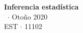 \documentclass[8pt,a4paper]{extarticle}
\renewcommand{\csClass}{Inferencia estadística}
\renewcommand{\csClassCode}{EST $\cdot$ 11102}
\renewcommand{\csTerm}{Otoño 2020}
\begin{document}
\begin{titlepage}
    \begin{center}
        \vspace*{1cm}
        \Huge
        \textbf{\csClass}
        \vspace{0.5cm} \\
        \Large
        \cs\ $\cdot$ \csTerm
        \vfill
        \csAuthorName\\
        \vspace{0.8cm}
        \csClassCode\\
        \csSchool
    \end{center}
\end{titlepage}

\begin{multicols}{3}
    \setcounter{page}{1}

    \vfill\eject
    \columnbreak
\end{multicols}
\end{document}
